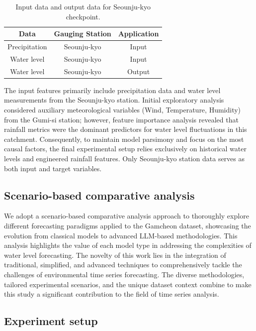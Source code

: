 \documentclass[a4paper,twoside,flushend, 10pt]{article}
\begin{document}
\begin{table}[H]
\centering
\begin{tabular}{|c|c|c|}
\hline
\textbf{Data} & \textbf{Gauging Station} & \textbf{Application} \\
\hline
Precipitation &  Seounju-kyo & Input \\
Water level &  Seounju-kyo & Input \\
\hline
Water level & Seounju-kyo & Output \\
\hline
\end{tabular}
\caption{Input data and output data for Seounju-kyo checkpoint.}
\label{tab:data}
\end{table}

The input features primarily include precipitation data and water level measurements from the Seounju-kyo station. Initial exploratory analysis considered auxiliary meteorological variables (Wind, Temperature, Humidity) from the Gumi-si station; however, feature importance analysis revealed that rainfall metrics were the dominant predictors for water level fluctuations in this catchment. Consequently, to maintain model parsimony and focus on the most causal factors, the final experimental setup relies exclusively on historical water levels and engineered rainfall features. Only Seounju-kyo station data serves as both input and target variables.

\subsection{Scenario-based comparative analysis}

We adopt a scenario-based comparative analysis approach to thoroughly explore different forecasting paradigms applied to the Gamcheon dataset, showcasing the evolution from classical models to advanced LLM-based methodologies. This analysis highlights the value of each model type in addressing the complexities of water level forecasting. The novelty of this work lies in the integration of traditional, simplified, and advanced techniques to comprehensively tackle the challenges of environmental time series forecasting. The diverse methodologies, tailored experimental scenarios, and the unique dataset context combine to make this study a significant contribution to the field of time series analysis.

\subsection{Experiment setup}
\end{document}
